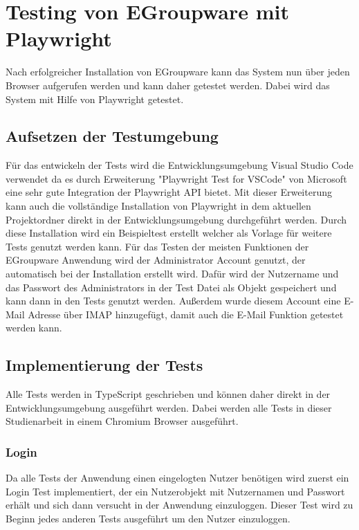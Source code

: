 \chapter{Testing von EGroupware mit Playwright}

Nach erfolgreicher Installation von EGroupware kann das System nun über jeden Browser aufgerufen werden und kann daher getestet werden.
Dabei wird das System mit Hilfe von Playwright getestet.

\section{Aufsetzen der Testumgebung}

Für das entwickeln der Tests wird die Entwicklungsumgebung Visual Studio Code verwendet da es durch  Erweiterung "Playwright Test for VSCode" von Microsoft eine sehr gute Integration der Playwright API bietet.
Mit dieser Erweiterung kann auch die vollständige Installation von Playwright in dem aktuellen Projektordner direkt in der Entwicklungsumgebung durchgeführt werden.
Durch diese Installation wird ein Beispieltest erstellt welcher als Vorlage für weitere Tests genutzt werden kann.
Für das Testen der meisten Funktionen der EGroupware Anwendung wird der Administrator Account genutzt, der automatisch bei der Installation erstellt wird.
Dafür wird der Nutzername und das Passwort des Administrators in der Test Datei als Objekt gespeichert und kann dann in den Tests genutzt werden.
Außerdem wurde diesem Account eine E-Mail Adresse über IMAP hinzugefügt, damit auch die E-Mail Funktion getestet werden kann.

\section{Implementierung der Tests}

Alle Tests werden in TypeScript geschrieben und können daher direkt in der Entwicklungsumgebung ausgeführt werden.
Dabei werden alle Tests in dieser Studienarbeit in einem Chromium Browser ausgeführt.


\subsection{Login}

Da alle Tests der Anwendung einen eingelogten Nutzer benötigen wird zuerst ein Login Test implementiert, der ein Nutzerobjekt mit Nutzernamen und Passwort erhält und sich dann versucht in der Anwendung einzuloggen.
Dieser Test wird zu Beginn jedes anderen Tests ausgeführt um den Nutzer einzuloggen.

